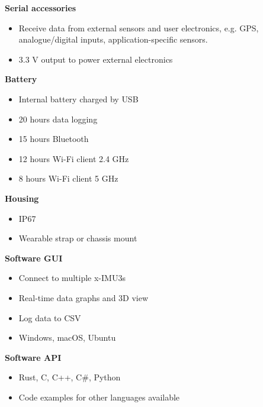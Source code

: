 \begin{multicols}{2}
\textbf{Serial accessories}
\begin{itemize}[nolistsep]
    \item Receive data from external sensors and user electronics, e.g. \acs{GPS}, analogue/digital inputs, application-specific sensors.
    \item 3.3 V output to power external electronics
\end{itemize}

\textbf{Battery}
\begin{itemize}[nolistsep]
    \item Internal battery charged by \acs{USB}
    \item 20 hours data logging
    \item 15 hours Bluetooth
    \item 12 hours Wi-Fi client 2.4 GHz
    \item 8 hours Wi-Fi client 5 GHz
\end{itemize}

\textbf{Housing}
\begin{itemize}[nolistsep]
    \item \acs{IP67}
    \item Wearable strap or chassis mount
\end{itemize}

\textbf{Software \acs{GUI}}
\begin{itemize}[nolistsep]
    \item Connect to multiple x-IMU3s
    \item Real-time data graphs and 3D view
    \item Log data to \acs{CSV}
    \item Windows, macOS, Ubuntu
\end{itemize}

\textbf{Software \acs{API}}
\begin{itemize}[nolistsep]
    \item Rust, C, C++, C\#, Python
    \item Code examples for other languages available
\end{itemize}

\end{multicols}

\clearpage
